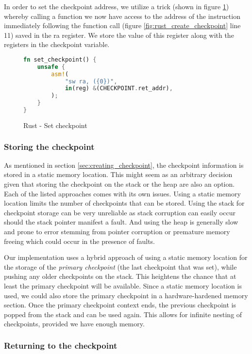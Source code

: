 In order to set the checkpoint address, we utilize a trick (shown in figure \ref{fig:rust_set_checkpoint}) whereby calling a function we now have access to the address of the instruction immediately following the function call (figure \ref{fig:rust_create_checkpoint} line 11) saved in the \acrshort{ra} register. We store the value of this register along with the registers in the checkpoint variable.

\begin{figure}[!h]
\begin{lstlisting}[language=Rust]
fn set_checkpoint() {
    unsafe {
        asm!(
            "sw ra, ({0})",
            in(reg) &(CHECKPOINT.ret_addr),
        );
    }
}
\end{lstlisting}
\caption{Rust - Set checkpoint}
\label{fig:rust_set_checkpoint}
\end{figure}

\subsubsection{Storing the checkpoint}

As mentioned in section \ref{sec:creating_checkpoint}, the checkpoint information is stored in a static memory location. This might seem as an arbitrary decision given that storing the checkpoint on the stack or the heap are also an option. Each of the listed approaches comes with its own issues. Using a static memory location limits the number of checkpoints that can be stored. Using the stack for checkpoint storage can be very unreliable as stack corruption can easily occur should the stack pointer manifest a fault. And using the heap is generally slow and prone to error stemming from pointer corruption or premature memory freeing which could occur in the presence of faults.

Our implementation uses a hybrid approach of using a static memory location for the storage of the \textit{primary checkpoint} (the last checkpoint that was set), while pushing any older checkpoints on the stack. This heightens the chance that at least the primary checkpoint will be available. Since a static memory location is used, we could also store the primary checkpoint in a hardware-hardened memory section. Once the primary checkpoint context ends, the previous checkpoint is popped from the stack and can be used again. This allows for infinite nesting of checkpoints, provided we have enough memory.

\subsubsection{Returning to the checkpoint}

